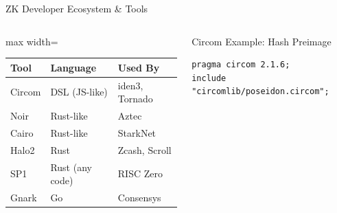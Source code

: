 \documentclass[8pt,aspectratio=169]{beamer}
\begin{document}
\begin{frame}[fragile]{ZK Developer Ecosystem \& Tools}
\begin{columns}[T]
\footnotesize
\begin{center}
\begin{adjustbox}{max width=\columnwidth}
\begin{tabular}{l l l}
\toprule
\textbf{Tool} & \textbf{Language} & \textbf{Used By} \\
\midrule
Circom & DSL (JS-like) & iden3, Tornado \\
Noir & Rust-like & Aztec \\
Cairo & Rust-like & StarkNet \\
Halo2 & Rust & Zcash, Scroll \\
SP1 & Rust (any code) & RISC Zero \\
Gnark & Go & Consensys \\
\bottomrule
\end{tabular}
\end{adjustbox}
\end{center}
\vspace{0.1cm}
\begin{block}{\footnotesize Circom Example: Hash Preimage}
\footnotesize
\begin{lstlisting}[basicstyle=\fontsize{4.5pt}{5.5pt}\ttfamily,
  morekeywords={pragma,circom,template,signal,input,output,component,main}]
pragma circom 2.1.6;
include "circomlib/poseidon.circom";


\end{lstlisting}
\end{block}
\end{columns}
\end{frame}
\end{document}
